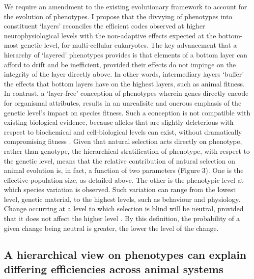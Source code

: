 \documentclass[twocolumn]{article}
\begin{document}
We require an amendment to the existing evolutionary framework to account for the evolution of phenotypes. I propose that the divvying of phenotypes into constituent `layers' \cite{Ho_Ohya_Zhang_2017, zhang_2018, wideman_doolittle_2019, mayr_1997} reconciles the efficient codes observed at higher neurophysiological levels with the non-adaptive effects expected at the bottom-most genetic level, for multi-cellular eukaryotes. The key advancement that a hierarchy of `layered' phenotypes provides is that elements of a bottom layer can afford to drift and be inefficient, provided their effects do not impinge on the integrity of the layer directly above. In other words, intermediary layers `buffer' the effects that bottom layers have on the highest layers, such as animal fitness. In contrast, a `layer-free' conception of phenotypes wherein genes directly encode for organismal attributes, results in an unrealisitc and onerous emphasis of the genetic level's impact on species fitness. Such a conception is not compatible with existing biological evidence, because alleles that are slightly deleterious with respect to biochemical and cell-biological levels can exist, without dramatically compromising fitness \cite{wideman_doolittle_2019}. Given that natural selection acts directly on phenotype, rather than genotype, the hierarchical stratification of phenotype, with respect to the genetic level, means that the relative contribution of natural selection on animal evolution is, in fact, a function of two parameters (Figure 3). One is the effective population size, as detailed above. The other is the phenotypic level at which species variation is observed. Such variation can range from the lowest level, genetic material, to the highest levels, such as behaviour and physiology. Change occurring at a level to which selection is blind will be neutral, provided that it does not affect the higher level \cite{mayr_1997, wideman_doolittle_2019, zhang_2018}. By this definition, the probability of a given change being neutral is greater, the lower the level of the change. 

\subsection{A hierarchical view on phenotypes can explain differing efficiencies across animal systems}
\end{document}
